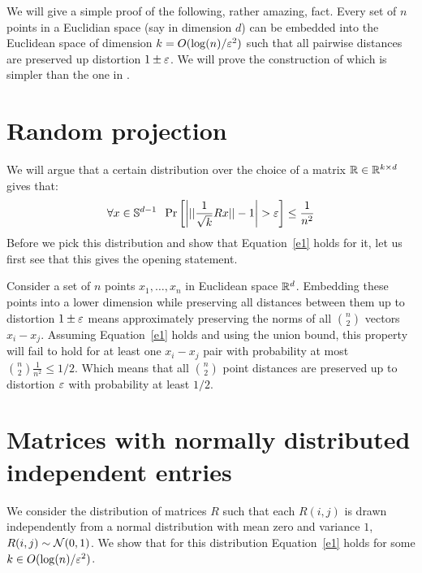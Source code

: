 \documentclass{article}
\begin{document}

We will give a simple proof of the following, rather amazing, fact. Every set of $n$ points 
in a Euclidian space (say in dimension $d$) can be embedded into the Euclidean space of 
dimension $k = O(\log(n)/\varepsilon^2)$ such that all pairwise distances are preserved up distortion $1\pm \varepsilon$.
We will prove the construction of \cite{DasGuptaGupta99} which is simpler than the one in \cite{JL84}.

\section*{Random projection}
We will argue that a certain distribution over the choice of a matrix ${\mathbb{R}} \in {\mathbb{R}}^{k \times d}$ gives that:
\begin{equation}
\label{e1}
\forall x \in {\mathbb{S}}^{d-1} \;\; \Pr\left[ \left| ||\frac{1}{\sqrt{k}}Rx|| - 1 \right| > \varepsilon \right] \le \frac{1}{n^2} 
\end{equation}
Before we pick this distribution and show that Equation~\ref{e1} holds for it, let us first see
that this gives the opening statement. 

Consider a set of $n$ points $x_1,\ldots, x_n$ in Euclidean space ${\mathbb{R}}^d$. Embedding these points
into a lower dimension while preserving all distances between
them up to distortion $1\pm \varepsilon$ means approximately preserving the norms of all 
${n \choose 2}$ vectors $x_i - x_j$. Assuming Equation~\ref{e1} holds and using the union 
bound, this property will fail to hold for at least one $x_i - x_j$ pair with probability at most ${n \choose 2}\frac{1}{n^2} \le 1/2$.
Which means that all ${n \choose 2}$ point distances are preserved up to distortion $\varepsilon$ with probability at least $1/2$.


\section{Matrices with normally distributed independent entries}
We consider the distribution of matrices $R$ such that each $R(i,j)$ is drawn independently from  a
normal distribution with mean zero and variance $1$, $R(i,j) \sim {\mathcal{N}}(0,1)$. We show that for this
distribution Equation~\ref{e1} holds for some $k \in O(\log(n)/\varepsilon^2)$.
\end{document}
